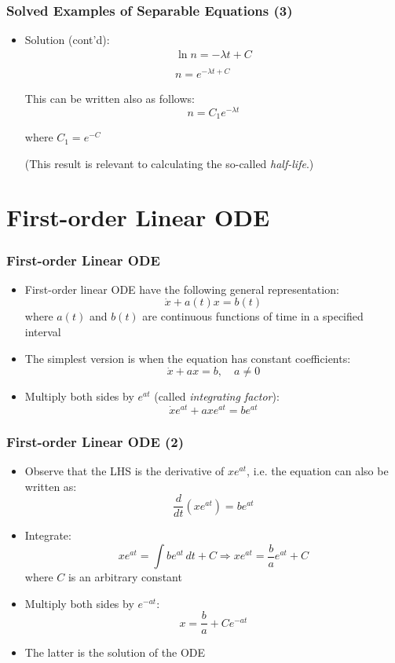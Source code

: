 \documentclass[10pt,usenames,dvipsnames]{beamer}
\theoremstyle{definition}
\begin{document}
\begin{frame}[fragile]
	\frametitle{Solved Examples of Separable Equations (3)}
	\begin{itemize}
		\color{red}
		\item Solution (cont'd): 
		\[
			\begin{array}{lcl}
				\ln n = -\lambda t + C\\
				\quad\\
				n = e^{-\lambda t + C}
			\end{array}	
		\]
		
		This can be written also as follows:
		\[
			n = C_{1}e^{-\lambda t}
		\]
		
		where $ C_{1} = e^{-C} $
		\vspace{1cm}
		
		(This result is relevant to calculating the so-called \textit{half-life}.)
	\end{itemize}
\end{frame}

\section{First-order Linear ODE}
\begin{frame}[fragile]
\frametitle{First-order Linear ODE}
\begin{itemize}
	\item First-order linear ODE have the following general representation:
	\[
		\dot{x} + a(t)x = b(t)
	\]
	where $a(t)$ and $b(t)$ are continuous functions of time in a specified interval
	\item The simplest version is when the equation has constant coefficients:
	\[
		\dot{x} + ax = b, \quad a \neq 0
	\]
	\item Multiply both sides by $e^{at}$ (called \textit{integrating factor}):
	\[
		\dot{x}e^{at} + axe^{at} = be^{at}
	\]
\end{itemize}
\end{frame}

\begin{frame}[fragile]
\frametitle{First-order Linear ODE (2)}
\begin{itemize}
	\item Observe that the LHS is the derivative of $xe^{at}$, i.e. the equation can also be written as:
	\[
		\dfrac{d}{dt}(xe^{at}) = be^{at}
	\]
	\item Integrate:
	\[
		xe^{at} = \int be^{at}\, dt + C \Rightarrow xe^{at} = \dfrac{b}{a}e^{at} + C
	\]
	where $C$ is an arbitrary constant
	\item Multiply both sides by $e^{-at}$:
	\[
		x = \dfrac{b}{a} + Ce^{-at}
	\]
	\item The latter is the solution of the ODE
\end{itemize}
\end{frame}
\end{document}
